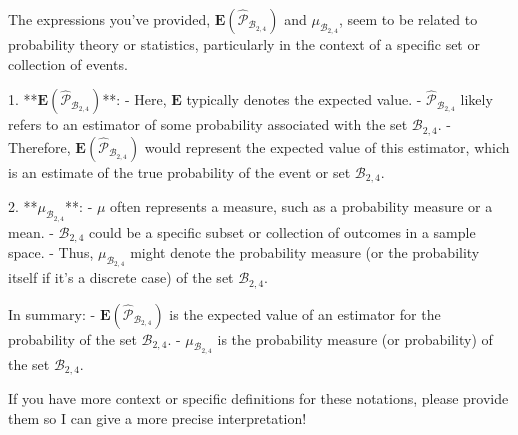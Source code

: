 The expressions you've provided, \(\mathbf{E}(\widehat{\mathcal{P}}_{\mathcal{B}_{2,4}})\) and \(\mu_{\mathcal{B}_{2,4}}\), seem to be related to probability theory or statistics, particularly in the context of a specific set or collection of events.

1. **\(\mathbf{E}(\widehat{\mathcal{P}}_{\mathcal{B}_{2,4}})\)**:
   - Here, \(\mathbf{E}\) typically denotes the expected value.
   - \(\widehat{\mathcal{P}}_{\mathcal{B}_{2,4}}\) likely refers to an estimator of some probability associated with the set \(\mathcal{B}_{2,4}\).
   - Therefore, \(\mathbf{E}(\widehat{\mathcal{P}}_{\mathcal{B}_{2,4}})\) would represent the expected value of this estimator, which is an estimate of the true probability of the event or set \(\mathcal{B}_{2,4}\).

2. **\(\mu_{\mathcal{B}_{2,4}}\)**:
   - \(\mu\) often represents a measure, such as a probability measure or a mean.
   - \(\mathcal{B}_{2,4}\) could be a specific subset or collection of outcomes in a sample space.
   - Thus, \(\mu_{\mathcal{B}_{2,4}}\) might denote the probability measure (or the probability itself if it's a discrete case) of the set \(\mathcal{B}_{2,4}\).

In summary:
- \(\mathbf{E}(\widehat{\mathcal{P}}_{\mathcal{B}_{2,4}})\) is the expected value of an estimator for the probability of the set \(\mathcal{B}_{2,4}\).
- \(\mu_{\mathcal{B}_{2,4}}\) is the probability measure (or probability) of the set \(\mathcal{B}_{2,4}\).

If you have more context or specific definitions for these notations, please provide them so I can give a more precise interpretation!